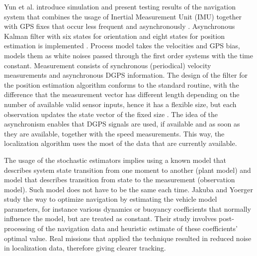 Yun et al. introduce simulation and present testing results of the navigation system that combines the usage of Inertial Measurement Unit (IMU) together with GPS fixes that occur less frequent and asynchronously \cite{yun00}. Asynchronous Kalman filter with six states for orientation and eight states for position estimation is implemented \cite{yun00}. Process model takes the velocities and GPS bias, models them as white noises passed through the first order systems with the time constant. Measurement consists of synchronous (periodical) velocity measurements and asynchronous DGPS information. The design of the filter for the position estimation algorithm conforms to the standard routine, with the difference that the measurement vector has different length depending on the number of available valid sensor inputs, hence it has a flexible size, but each observation updates the state vector of the fixed size \cite{yun00}. The idea of the asynchronism enables that DGPS signals are used, if available and as soon as they are available, together with the speed measurements. This way, the localization algorithm uses the most of the data that are currently available.

The usage of the stochastic estimators implies using a known model that describes system state transition from one moment to another (plant model) and model that describes transition from state to the measurement (observation model). Such model does not have to be the same each time. Jakuba and Yoerger \cite{jakuba03} study the way to optimize navigation by estimating the vehicle model parameters, for instance various dynamics or buoyancy coefficients that normally influence the model, but are treated as constant. Their study involves post-processing of the navigation data and heuristic estimate of these coefficients' optimal value. Real missions that applied the technique resulted in reduced noise in localization data, therefore giving clearer tracking. 

